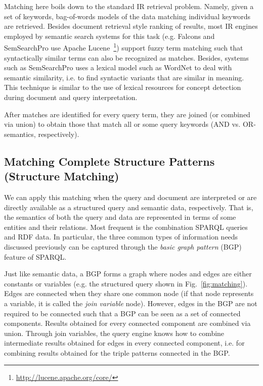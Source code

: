 Matching here boils down to the standard IR retrieval problem. Namely, given a set of keywords, bag-of-words models of the data matching individual keywords are retrieved. Besides document retrieval style ranking of results, most IR engines employed by semantic search systems for this task (e.g. Falcons and SemSearchPro use Apache Lucene~\footnote{\url{http://lucene.apache.org/core/}}) support fuzzy term matching such that syntactically similar terms can also be recognized as matches. Besides, systems such as SemSearchPro uses a lexical model such as WordNet to deal with semantic similarity, i.e. to find syntactic variants that are similar in meaning. This technique is similar to the use of lexical resources for concept detection during document and query interpretation. 

After matches are identified for every query term, they are joined (or combined via union) to obtain those that match all or some query keywords (AND vs. OR-semantics, respectively).
 

\subsection{Matching Complete Structure Patterns (Structure Matching)} 
	 We can apply this matching when the query and document are interpreted or are directly available as a structured query and semantic data, respectively. That is, the semantics of both the query and data are represented in terms of some entities and their relations. Most frequent is the combination SPARQL queries and RDF data. In particular, the three common types of information needs discussed previously can be captured through the \emph{basic graph pattern} (BGP) feature of SPARQL. 
	
	Just like semantic data, a BGP forms a graph where nodes and edges are either constants or variables (e.g. the structured query shown in Fig.~\ref{fig:matching}). Edges are connected when they share one common node (if that node represents a variable, it is called the \emph{join variable} node). However, edges in the BGP are not required to be connected such that a BGP can be seen as a set of connected components. Results obtained for every connected component are combined via union. Through join variables, the query engine knows how to combine intermediate results obtained for edges in every connected component, i.e. for combining results obtained for the triple patterns connected in the BGP. 
	
